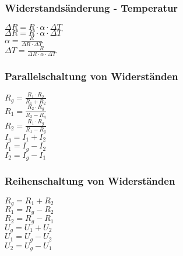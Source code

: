 \subsubsection{Widerstandsänderung - Temperatur} 
\begin{minipage}{0.45\textwidth} 
$ \Delta R = R\cdot \alpha \cdot \Delta T $\\ 
$ \Delta R = R\cdot \alpha \cdot \Delta T $\\ 
$ \alpha  = \frac{R}{\Delta R\cdot \Delta T} $\\ 
$ \Delta T = \frac{   R}{\Delta R\cdot \alpha \cdot \Delta T} $\\ 
\end{minipage} 
\begin{minipage}{0.45\textwidth} 
 
\end{minipage} 
\subsubsection{Parallelschaltung von Widerständen} 
\begin{minipage}{0.45\textwidth} 
$ R_{g}  = \frac{R_{1} \cdot R_{2} }{R_{1} +R_{2} } $\\ 
$ R_{1}  = \frac{R_{2} \cdot R_{g} }{R_{2} -R_{g} } $\\ 
$ R_{2}  = \frac{R_{1} \cdot R_{g} }{R_{1} -R_{g} } $\\ 
$ I_{g}  = I_{1}  + I_{2} $\\ 
$ I_{1}  = I_{g}  - I_{2} $\\ 
$ I_{2}  = I_{g}  - I_{1} $\\ 
\end{minipage} 
\begin{minipage}{0.45\textwidth} 
 
\end{minipage} 
\subsubsection{Reihenschaltung von Widerständen} 
\begin{minipage}{0.45\textwidth} 
$ R_{g}  = R_{1}  + R_{2} $\\ 
$ R_{1}  = R_{g}  - R_{2} $\\ 
$ R_{2}  = R_{g}  - R_{1} $\\ 
$ U_{g}  = U_{1}  + U_{2} $\\ 
$ U_{1}  = U_{g}  - U_{2} $\\ 
$ U_{2}  = U_{g}  - U_{1} $\\ 
\end{minipage} 
\begin{minipage}{0.45\textwidth} 
 
\end{minipage} 
